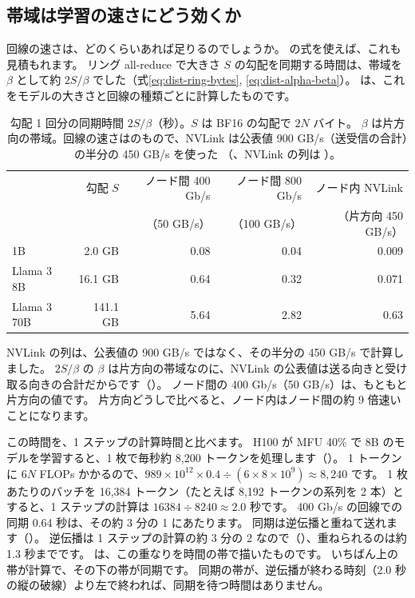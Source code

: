 \subsection*{帯域は学習の速さにどう効くか}

回線の速さは、どのくらいあれば足りるのでしょうか。
の式を使えば、これも見積もれます。
リング all-reduce で大きさ $S$ の勾配を同期する時間は、帯域を $\beta$ として約 $2S/\beta$ でした（式\eqref{eq:dist-ring-bytes}, \eqref{eq:dist-alpha-beta}）。
は、これをモデルの大きさと回線の種類ごとに計算したものです。

\begin{table}[tbp]
\centering
\caption{勾配 1 回分の同期時間 $2S/\beta$（秒）。$S$ は BF16 の勾配で $2N$ バイト。
$\beta$ は片方向の帯域。回線の速さはのもので、NVLink は公表値 900 GB/s（送受信の合計）の半分の 450 GB/s を使った
（、NVLink の列は ）。}
\label{tab:infra-sync}
\footnotesize
\begin{tabular}{lrrrr}
\toprule
 & 勾配 $S$ & ノード間 400 Gb/s & ノード間 800 Gb/s & ノード内 NVLink \\
 & & （50 GB/s） & （100 GB/s） & （片方向 450 GB/s） \\
\midrule
1B & 2.0 GB & 0.08 & 0.04 & 0.009 \\
Llama 3 8B & 16.1 GB & 0.64 & 0.32 & 0.071 \\
Llama 3 70B & 141.1 GB & 5.64 & 2.82 & 0.63 \\
\bottomrule
\end{tabular}
\end{table}

NVLink の列は、公表値の 900 GB/s ではなく、その半分の 450 GB/s で計算しました。
$2S/\beta$ の $\beta$ は片方向の帯域なのに、NVLink の公表値は送る向きと受け取る向きの合計だからです（）。
ノード間の 400 Gb/s（50 GB/s）は、もともと片方向の値です。
片方向どうしで比べると、ノード内はノード間の約 9 倍速いことになります。

この時間を、1 ステップの計算時間と比べます。
H100 が MFU 40\% で 8B のモデルを学習すると、1 枚で毎秒約 8,200 トークンを処理します（）。
1 トークンに $6N$ FLOPs かかるので、$989\times10^{12}\times0.4\div(6\times8\times10^{9})\approx8{,}240$ です。
1 枚あたりのバッチを 16,384 トークン（たとえば 8,192 トークンの系列を 2 本）とすると、1 ステップの計算は $16384\div8240\approx2.0$ 秒です。
400 Gb/s の回線での同期 0.64 秒は、その約 3 分の 1 にあたります。
同期は逆伝播と重ねて送れます（）。
逆伝播は 1 ステップの計算の約 3 分の 2 なので（）、重ねられるのは約 1.3 秒までです。
は、この重なりを時間の帯で描いたものです。
いちばん上の帯が計算で、その下の帯が同期です。
同期の帯が、逆伝播が終わる時刻（2.0 秒の縦の破線）より左で終われば、同期を待つ時間はありません。

